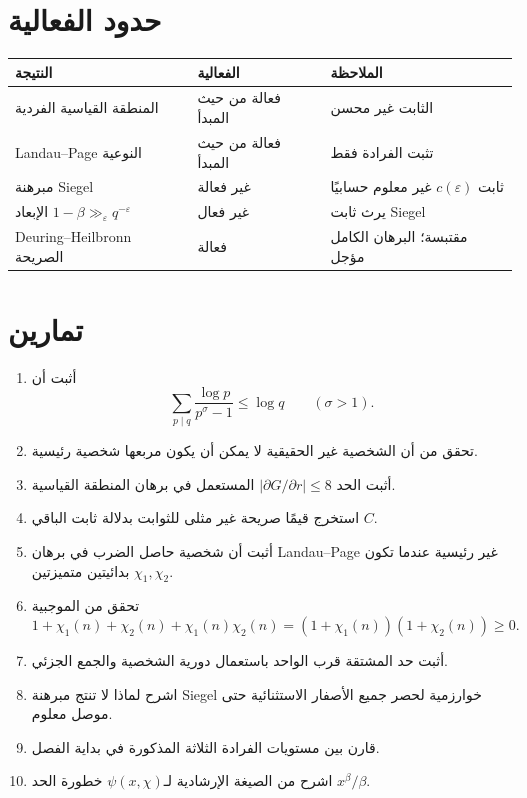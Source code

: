 \section{حدود الفعالية}

\begin{center}
\begin{tabular}{|p{}|p{}|p{}|}
\hline
\textbf{النتيجة} & \textbf{الفعالية} & \textbf{الملاحظة} \\
\hline
المنطقة القياسية الفردية & فعالة من حيث المبدأ & الثابت غير محسن \\
\hline
Landau--Page النوعية & فعالة من حيث المبدأ & تثبت الفرادة فقط \\
\hline
مبرهنة Siegel & غير فعالة & ثابت \(c(\varepsilon)\) غير معلوم حسابيًا \\
\hline
الإبعاد \(1-\beta\gg_\varepsilon q^{-\varepsilon}\) & غير فعال & يرث ثابت Siegel \\
\hline
Deuring--Heilbronn الصريحة & فعالة & مقتبسة؛ البرهان الكامل مؤجل \\
\hline
\end{tabular}
\end{center}

\section{تمارين}

\begin{enumerate}
  \item أثبت أن
  \[
  \sum_{p\mid q}\frac{\log p}{p^\sigma-1}\le\log q
  \qquad(\sigma>1).
  \]
  \item تحقق من أن الشخصية غير الحقيقية لا يمكن أن يكون مربعها شخصية
  رئيسية.
  \item أثبت الحد \(|\partial G/\partial r|\le8\) المستعمل في برهان
  المنطقة القياسية.
  \item استخرج قيمًا صريحة غير مثلى للثوابت بدلالة ثابت الباقي \(C\).
  \item أثبت أن شخصية حاصل الضرب في برهان Landau--Page غير رئيسية عندما
  تكون \(\chi_1,\chi_2\) بدائيتين متميزتين.
  \item تحقق من الموجبية
  \[
  1+\chi_1(n)+\chi_2(n)+\chi_1(n)\chi_2(n)
  =(1+\chi_1(n))(1+\chi_2(n))\ge0.
  \]
  \item أثبت حد المشتقة قرب الواحد باستعمال دورية الشخصية والجمع الجزئي.
  \item اشرح لماذا لا تنتج مبرهنة Siegel خوارزمية لحصر جميع الأصفار
  الاستثنائية حتى موصل معلوم.
  \item قارن بين مستويات الفرادة الثلاثة المذكورة في بداية الفصل.
  \item اشرح من الصيغة الإرشادية لـ\(\psi(x,\chi)\) خطورة الحد
  \(x^\beta/\beta\).
\end{enumerate}

